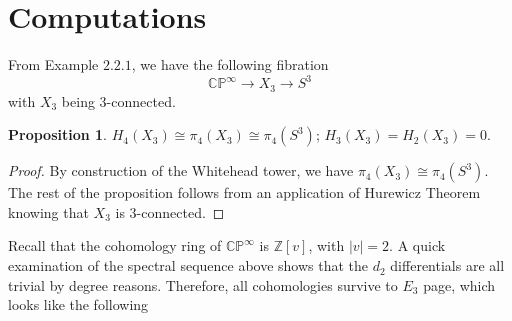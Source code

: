 \documentclass{article}
\theoremstyle{definition}
\theoremstyle{definition}
\newtheorem{proposition}{Proposition}[theorem]
\theoremstyle{definition}
\theoremstyle{definition}
\theoremstyle{definition}
\theoremstyle{definition}
\begin{document}
\section{Computations}
From Example $2.2.1$, we have the following fibration
 \[\mathbb{CP} ^{\infty}\to X_3\to S^3\] 
 with $X_3$ being $3$-connected.
 
\begin{tcolorbox}[colback=blue!5!white,colframe=blue!30!white]
\begin{proposition}
$H_4(X_3)\cong \pi_4(X_3)\cong \pi_4(S^3)$; $H_3(X_3)=H_2(X_3)=0$.
\end{proposition}
\end{tcolorbox}
\begin{proof}
	By construction of the Whitehead tower, we have $\pi_4(X_3)\cong \pi_4(S^3)$. The rest of the proposition follows from an application of Hurewicz Theorem knowing that $X_3$ is $3$-connected. 
\end{proof}


Recall that the cohomology ring of $\mathbb{CP}^{\infty}$ is $\mathbb{Z}[v]$, with $|v|=2$. A quick examination of the spectral sequence above shows that the $d_2$ differentials are all trivial by degree reasons. Therefore, all cohomologies survive to $E_3$ page, which looks like the following 

\end{document}
